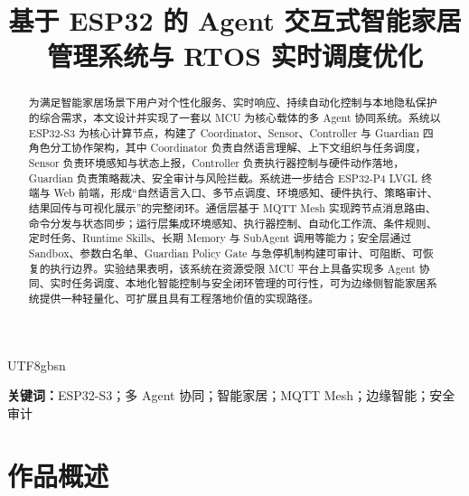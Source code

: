 \documentclass[a4paper,12pt]{article}
\title{基于 ESP32 的 Agent 交互式智能家居管理系统与 RTOS 实时调度优化}
\author{}
\date{}
\begin{document}
\begin{CJK*}{UTF8}{gbsn}
\maketitle

\begin{abstract}
为满足智能家居场景下用户对个性化服务、实时响应、持续自动化控制与本地隐私保护的综合需求，本文设计并实现了一套以 MCU 为核心载体的多 Agent 协同系统。系统以 ESP32-S3 为核心计算节点，构建了 Coordinator、Sensor、Controller 与 Guardian 四角色分工协作架构，其中 Coordinator 负责自然语言理解、上下文组织与任务调度，Sensor 负责环境感知与状态上报，Controller 负责执行器控制与硬件动作落地，Guardian 负责策略裁决、安全审计与风险拦截。系统进一步结合 ESP32-P4 LVGL 终端与 Web 前端，形成“自然语言入口、多节点调度、环境感知、硬件执行、策略审计、结果回传与可视化展示”的完整闭环。通信层基于 MQTT Mesh 实现跨节点消息路由、命令分发与状态同步；运行层集成环境感知、执行器控制、自动化工作流、条件规则、定时任务、Runtime Skills、长期 Memory 与 SubAgent 调用等能力；安全层通过 Sandbox、参数白名单、Guardian Policy Gate 与急停机制构建可审计、可阻断、可恢复的执行边界。实验结果表明，该系统在资源受限 MCU 平台上具备实现多 Agent 协同、实时任务调度、本地化智能控制与安全闭环管理的可行性，可为边缘侧智能家居系统提供一种轻量化、可扩展且具有工程落地价值的实现路径。
\end{abstract}

\noindent\textbf{关键词：}ESP32-S3；多 Agent 协同；智能家居；MQTT Mesh；边缘智能；安全审计

\section{作品概述}


\end{CJK*}
\end{document}
